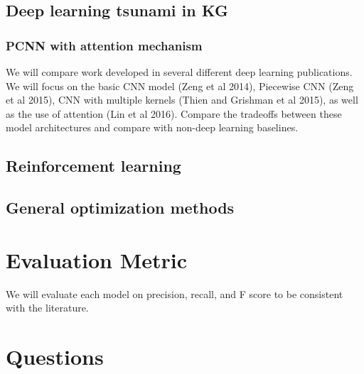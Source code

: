 \documentclass{article}
\begin{document}
\subsection{Deep learning tsunami in KG}

\subsubsection{PCNN with attention mechanism}
	We will compare work developed in several different deep learning publications. We will focus on the basic CNN model (Zeng et al 2014), Piecewise CNN (Zeng et al 2015), CNN with multiple kernels (Thien and Grishman et al 2015), as well as the use of attention (Lin et al 2016). Compare the tradeoffs between these model architectures and compare with non-deep learning baselines. \citet{DBLP:conf/acl/LinSLLS16}
	
\subsection{Reinforcement learning}


\subsection{General optimization methods}
  

\section{Evaluation Metric}
	We will evaluate each model on precision, recall, and F score to be consistent with the literature.
 
 
\section{Questions}



\medskip




\small
\end{document}
